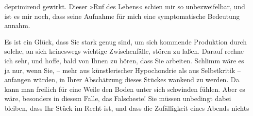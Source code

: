                deprimirend gewirkt. Dieser »Ruf des Lebens«
               schien mir so unbezweifelbar, und ist es mir noch, dass seine Aufnahme für mich eine
               symptomatische Bedeutung annahm.\pend
           
\pstart
           Es ist ein Glück, dass Sie stark genug sind, um sich kommende Produktion durch
               solche, an sich keineswegs wichtige Zwischenfälle, stören zu laßen. Darauf rechne ich
               sehr, und hoffe, bald von Ihnen zu hören, dass Sie arbeiten. Schlimm wäre es ja nur,
               wenn Sie, – mehr aus künstlerischer Hypochondrie als aus Selbstkritik – anfangen
               würden, in Ihrer Abschätzung dieses Stückes wankend zu werden. Da kann man freilich für eine Weile den Boden
               unter sich schwinden fühlen. Aber es wäre, besonders in diesem Falle, das Falscheste!
               Sie müssen unbedingt dabei bleiben, dass Ihr Stück im Recht ist, und dass die Zufälligkeit eines Abends nichts
